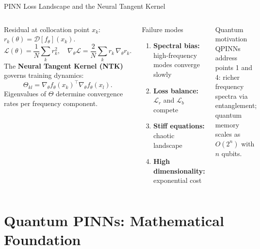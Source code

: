 \documentclass[aspectratio=169,11pt]{beamer}
\begin{document}
\begin{frame}{PINN Loss Landscape and the Neural Tangent Kernel}
  \begin{columns}[T]
    Residual at collocation point $x_k$:
    $r_k(\theta) = \mathcal{D}[f_\theta](x_k)$.
    \[
      \mathcal{L}(\theta)
      = \frac{1}{N}\sum_k r_k^2,\quad
      \nabla_\theta\mathcal{L}
      = \frac{2}{N}\sum_k r_k\,\nabla_\theta r_k.
    \]
    The \textbf{Neural Tangent Kernel (NTK)} governs
    training dynamics:
    \[
      \Theta_{kl}
      = \nabla_\theta f_\theta(x_k)^\top
        \nabla_\theta f_\theta(x_l).
    \]
    Eigenvalues of $\Theta$ determine convergence rates
    per frequency component.
    \begin{alertblock}{Failure modes}
      \begin{enumerate}
        \item \textbf{Spectral bias:} high-frequency modes
              converge slowly
        \item \textbf{Loss balance:}
              $\mathcal{L}_r$ and $\mathcal{L}_b$ compete
        \item \textbf{Stiff equations:} chaotic landscape
        \item \textbf{High dimensionality:} exponential cost
      \end{enumerate}
    \end{alertblock}
    \begin{block}{Quantum motivation}
      QPINNs address points 1 and 4: richer frequency
      spectra via entanglement; quantum memory scales as
      $O(2^n)$ with $n$ qubits.
    \end{block}
  \end{columns}
\end{frame}

\section{Quantum PINNs: Mathematical Foundation}
\end{document}
